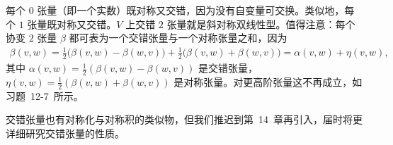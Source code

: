 \documentclass[../../main.tex]{subfiles}
\begin{document}
每个 $0$ 张量（即一个实数）既对称又交错，因为没有自变量可交换。类似地，每个 $1$ 张量既对称又交错。$V$ 上交错 $2$ 张量就是斜对称双线性型。值得注意：每个协变 $2$ 张量 $\beta$ 都可表为一个交错张量与一个对称张量之和，因为
\begin{align*}
\beta(v,w)=\frac{1}{2}\big(\beta(v,w)-\beta(w,v)\big)+\frac{1}{2}\big(\beta(v,w)+\beta(w,v)\big)=\alpha(v,w)+\eta(v,w),
\end{align*}
其中 $\alpha(v,w)=\frac{1}{2}(\beta(v,w)-\beta(w,v))$ 是交错张量，$\eta(v,w)=\frac{1}{2}(\beta(v,w)+\beta(w,v))$ 是对称张量。对更高阶张量这不再成立，如习题~12-7~所示。

交错张量也有对称化与对称积的类似物，但我们推迟到第~14~章再引入，届时将更详细研究交错张量的性质。
\end{document}
